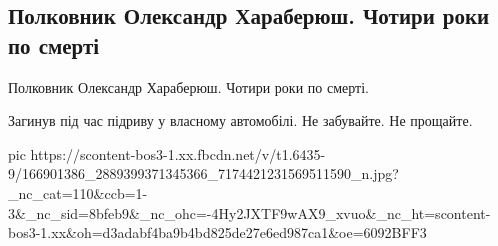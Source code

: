  
 
 
 
 

\subsection{Полковник Олександр Хараберюш. Чотири роки по смерті}

Полковник Олександр Хараберюш.  Чотири роки по смерті.

Загинув під час підриву у власному автомобілі.
Не забувайте. Не прощайте.

\ifcmt
  pic https://scontent-bos3-1.xx.fbcdn.net/v/t1.6435-9/166901386_2889399371345366_7174421231569511590_n.jpg?_nc_cat=110&ccb=1-3&_nc_sid=8bfeb9&_nc_ohc=-4Hy2JXTF9wAX9_xvuo&_nc_ht=scontent-bos3-1.xx&oh=d3adabf4ba9b4bd825de27e6ed987ca1&oe=6092BFF3
\fi

